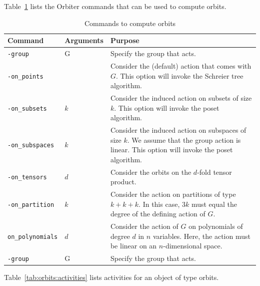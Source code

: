 Table~\ref{tab:orbits} 
lists the Orbiter commands that can be used
to compute orbits. 
\begin{table}
\begin{center}
\begin{tabular}{|p{4cm}|p{3cm}|p{7cm}|}
\hline
Command & Arguments & Purpose \\
\hline
\hline
\verb'-group' &  G & Specify the group that acts. \\
\hline
\verb'-on_points' &   & Consider the (default) action that comes with $G$. This option will invoke the Schreier tree algorithm. \\
\hline
\verb'-on_subsets' & $k$  & Consider the induced action on subsets of size $k$. This option will invoke the poset algorithm. \\
\hline
\verb'-on_subspaces' & $k$  & Consider the induced action on subspaces of size $k$. We assume that the group action is linear. This option will invoke the poset algorithm. \\
\hline
\verb'-on_tensors' & $d$  & Consider the orbits on the $d$-fold tensor product. \\
\hline
\verb'-on_partition' &  $k$ & Consider the action on partitions of type $k+k+k$. In this case, $3k$ must equal the degree of the defining action of $G$. \\
\hline
\verb'on_polynomials' &  $d$ & Consider the action of $G$ on polynomials of degree $d$ in $n$ variables. Here, the action must be linear on an $n$-dimensional space. \\
\hline
\verb'-group' &  G & Specify the group that acts. \\
\hline
\end{tabular}
\end{center}
\caption{\label{tab:orbits}Commands to compute orbits}
\end{table}
Table~\ref{tab:orbits:activities} lists activities for an object of type orbits.
